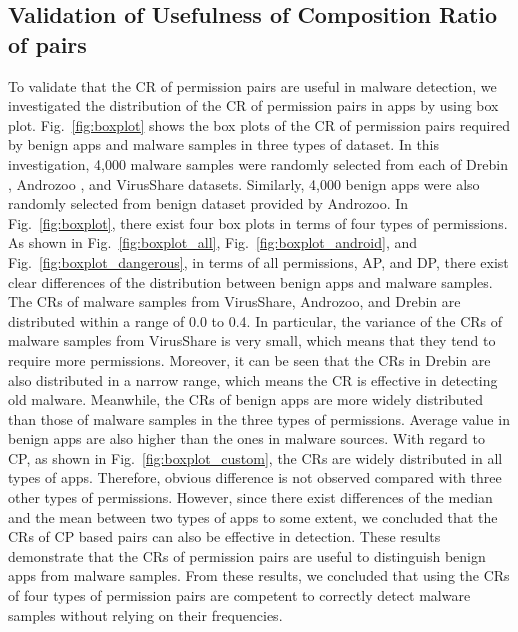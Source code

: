 \documentclass{ieeeaccess}
\newcommand{\myfigurename}{Fig.}
\begin{document}
\subsection{Validation of Usefulness of Composition Ratio of pairs} 
To validate that the CR of permission pairs are useful in malware detection, we investigated the distribution of the CR of permission pairs in apps by using box plot.
\myfigurename~\ref{fig:boxplot} shows the box plots of the CR of permission pairs required by benign apps and malware samples in three types of dataset.
In this investigation, 4,000 malware samples were randomly selected from each of Drebin \cite{arp2014drebin}, Androzoo \cite{allix2016androzoo}, and VirusShare \cite{virusshare} datasets.
Similarly, 4,000 benign apps were also randomly selected from benign dataset provided by Androzoo.
In \myfigurename~\ref{fig:boxplot}, there exist four box plots in terms of four types of permissions.
As shown in \myfigurename~\ref{fig:boxplot_all}, \myfigurename~\ref{fig:boxplot_android}, and \myfigurename~\ref{fig:boxplot_dangerous}, in terms of all permissions, AP, and DP, there exist clear differences of the distribution between benign apps and malware samples.  
The CRs of malware samples from VirusShare, Androzoo, and Drebin are distributed within a range of 0.0 to 0.4.
In particular, the variance of the CRs of malware samples from VirusShare is very small, which means that they tend to require more permissions.
Moreover, it can be seen that the CRs in Drebin are also distributed in a narrow range, which means the CR is effective in detecting old malware.
Meanwhile, the CRs of benign apps are more widely distributed than those of malware samples in the three types of permissions.
Average value in benign apps are also higher than the ones in malware sources.
With regard to CP, as shown in \myfigurename~\ref{fig:boxplot_custom}, the CRs are widely distributed in all types of apps.
Therefore, obvious difference is not observed compared with three other types of permissions.
However, since there exist differences of the median and the mean between two types of apps to some extent, we concluded that the CRs of CP based pairs can also be effective in detection.
These results demonstrate that the CRs of permission pairs are useful to distinguish benign apps from malware samples.
From these results, we concluded that using the CRs of four types of permission pairs are competent to correctly detect malware samples without relying on their frequencies.
\end{document}
